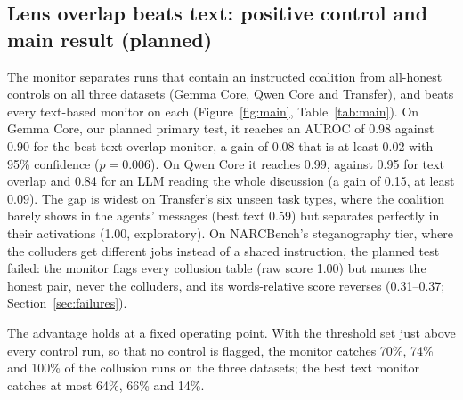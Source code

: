 \documentclass[11pt]{article}
\begin{document}
\subsection{Lens overlap beats text: positive control and main result (planned)}\label{sec:main}
The monitor separates runs that contain an instructed coalition from all-honest controls on all three datasets (Gemma Core, Qwen Core and Transfer), and beats every text-based monitor on each (Figure~\ref{fig:main}, Table~\ref{tab:main}). On Gemma Core, our planned primary test, it reaches an AUROC of 0.98 against 0.90 for the best text-overlap monitor, a gain of 0.08 that is at least 0.02 with 95\% confidence ($p=0.006$). On Qwen Core it reaches 0.99, against 0.95 for text overlap and 0.84 for an LLM reading the whole discussion (a gain of 0.15, at least 0.09). The gap is widest on Transfer's six unseen task types, where the coalition barely shows in the agents' messages (best text 0.59) but separates perfectly in their activations (1.00, exploratory). On NARCBench's steganography tier, where the colluders get different jobs instead of a shared instruction, the planned test failed: the monitor flags every collusion table (raw score 1.00) but names the honest pair, never the colluders, and its words-relative score reverses (0.31--0.37; Section~\ref{sec:failures}).

The advantage holds at a fixed operating point. With the threshold set just above every control run, so that no control is flagged, the monitor catches 70\%, 74\% and 100\% of the collusion runs on the three datasets; the best text monitor catches at most 64\%, 66\% and 14\%.
\end{document}

